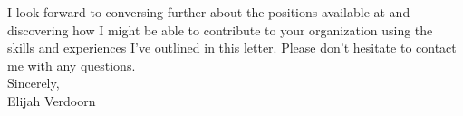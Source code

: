 \noindent I look forward to conversing further about the positions available at \company and discovering how I might be able to contribute to your organization using the skills and experiences I've outlined in this letter. Please don't hesitate to contact me with any questions.\\

\noindent Sincerely,
\\\noindent
Elijah Verdoorn

